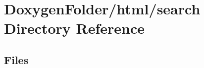 \section{Doxygen\+Folder/html/search Directory Reference}
\label{dir_62022d45a4f39118ef1dc9893facaa18}
\subsection*{Files}
\begin{DoxyCompactItemize}
\end{DoxyCompactItemize}
